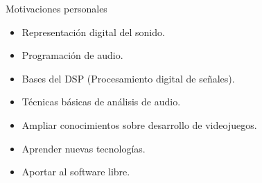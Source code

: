 \begin{frame}{Motivaciones personales}
  \begin{itemize}
  \item Representación digital del sonido.
  \item Programación de audio.\pause

  \item Bases del DSP (Procesamiento digital de señales).
  \item Técnicas básicas de análisis de audio.\pause

  \item Ampliar conocimientos sobre desarrollo de videojuegos.
  \item Aprender nuevas tecnologías.
  \item Aportar al software libre.
  \end{itemize}
\end{frame}


